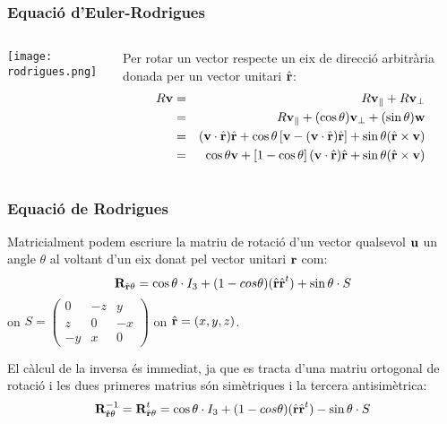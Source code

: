 \documentclass{beamer}
\begin{document}
\begin{frame}
  \frametitle{Equació d'Euler-Rodrigues}
  \begin{columns}
    \begin{column}{0.4\textwidth}
      \begin{center}
        \texttt{[image: rodrigues.png]}
      \end{center}
    \end{column}
    \begin{column}{0.7\textwidth}
       Per rotar un vector  respecte un  eix de direcció arbitrària donada per un vector unitari $\hat{\textbf{r}}$:\cite{vanverth}
       \footnotesize
       \begin{eqnarray*}
         R \textbf{v}
         &=& R\textbf{v}_{\parallel} +R\textbf{v}_{\perp}\\
         &=& R\textbf{v}_{\parallel} + (\cos{\theta}) \textbf{v}_{\perp} + (\sin{\theta})\textbf{w}\\
         &=& (\textbf{v}\cdot\hat{\textbf{r}})\hat{\textbf{r}}+\cos{\theta}\left[\textbf{v}-(\textbf{v}\cdot\hat{\textbf{r}})\hat{\textbf{r}}\right]+\sin{\theta}(\hat{\textbf{r}}\times \textbf{v} )\\
         &=&\cos{\theta} \textbf{v} + \left[1-\cos{\theta}\right](\textbf{v}\cdot\hat{\textbf{r}})\hat{\textbf{r}}+\sin{\theta}(\hat{\textbf{r}}\times \textbf{v} )
      \end{eqnarray*}
      \normalsize
    \end{column}
  \end{columns}
\end{frame}

\begin{frame}
  \frametitle{Equació de Rodrigues}
  Matricialment podem escriure la matriu de rotació d'un vector qualsevol $\textbf{u}$ un angle $\theta$ al voltant d'un eix donat pel vector unitari $\textbf{r}$ com:
  \begin{equation}
  \textbf{R}_{\hat{\textbf{r}}\theta}=\cos{\theta}\cdot I_3 + (1-cos{\theta})(\hat{\textbf{r}}\hat{\textbf{r}}^t)+\sin{\theta}\cdot S
  \label{eq:rodrigues}
  \end{equation}
  on $S=\begin{pmatrix}0&-z&y\\z&0&-x\\-y&x&0\end{pmatrix}$ on $\hat{\textbf{r}}=(x,y,z)$.

  El càlcul de la inversa és immediat, ja que es tracta d'una matriu ortogonal de rotació i les dues primeres matrius són simètriques i la tercera antisimètrica:
  \[
  \textbf{R}_{\hat{\textbf{r}}\theta}^{-1}=\textbf{R}_{\hat{\textbf{r}}\theta}^{t}=\cos{\theta}\cdot I_3 + (1-cos{\theta})(\hat{\textbf{r}}\hat{\textbf{r}}^t)-\sin{\theta}\cdot S
  \]
\end{frame}
\end{document}
